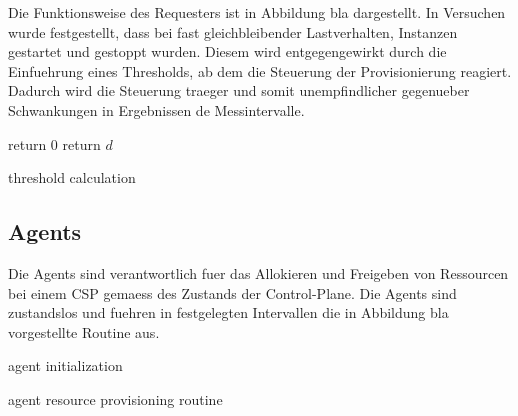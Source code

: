 \documentclass[runningheads]{llncs}
\begin{document}
Die Funktionsweise des Requesters ist in Abbildung bla dargestellt. In Versuchen wurde festgestellt, dass bei fast gleichbleibender Lastverhalten, Instanzen gestartet und gestoppt wurden. Diesem wird entgegengewirkt durch die Einfuehrung eines Thresholds, ab dem die Steuerung der Provisionierung reagiert. Dadurch  wird die Steuerung  traeger und somit unempfindlicher gegenueber Schwankungen in Ergebnissen de Messintervalle. \\


\begin{algorithm}[H]
	\DontPrintSemicolon
	{
		return 0
	}
	return $d$
	
	\caption{threshold calculation}
\end{algorithm}

\subsection{Agents}

Die Agents sind verantwortlich fuer das Allokieren und Freigeben von Ressourcen bei einem CSP gemaess des Zustands der Control-Plane. Die Agents sind zustandslos und fuehren in festgelegten Intervallen die in Abbildung bla vorgestellte Routine aus. \\

\begin{algorithm}[H]
	\DontPrintSemicolon
	agent initialization\;
	\caption{agent resource provisioning routine}
\end{algorithm}
\end{document}
